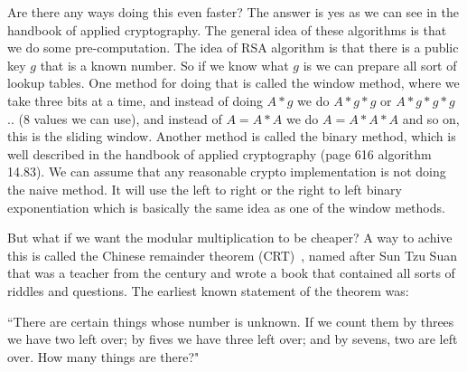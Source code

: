 Are there any ways doing this even faster? The answer is yes as we can see in the
handbook of applied cryptography. The general idea of
these algorithms is that we do some pre-computation. The idea of RSA algorithm is
that there is a public key $g$ that is a known number.
So if we know what $g$ is we can prepare all sort of lookup
tables. One method for doing that is called the window method,
where we take three bits at a time, and
instead of doing \(A*g\) we do \( A*g*g\) or \(A*g*g*g\) .. (8 values we can
use), and instead of \( A=A*A\) we do \(A=A*A*A\) and so on, this is the sliding
window. Another method is called the binary method, which is well described in
the handbook of applied cryptography (page 616 algorithm 14.83). We can assume 
that any reasonable crypto implementation is not doing the naive method.
It will use the left to right or the right to left binary exponentiation
which is basically the same idea as one of the window methods.

But what if we want the modular multiplication to be cheaper? A way to achive this 
is called the Chinese remainder theorem (CRT)~\cite{dingyi1996chinese}, named after 
Sun Tzu Suan that was a teacher from the  century and
wrote a book that contained all sorts of riddles and questions.
The earliest known statement of the theorem was: 

``There are certain things whose number is unknown.  If we count them by threes
we have two left over; by fives we have three left over; and by sevens, two are
left over. How many things are there?" 

